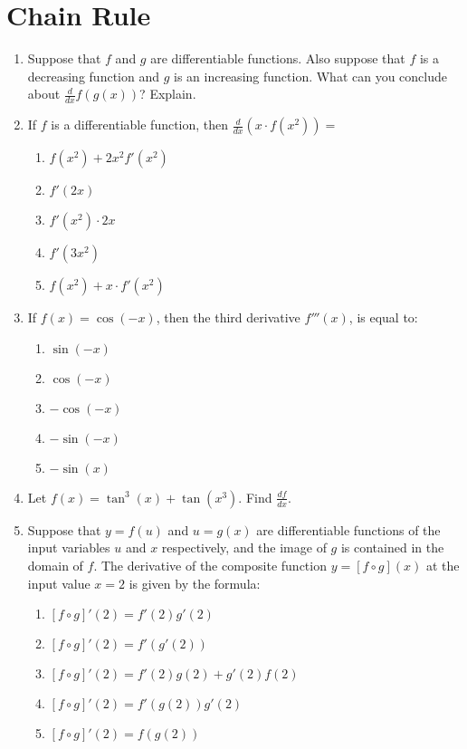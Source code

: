 \documentclass[12pt]{report}
\begin{document}
\newcommand{\less}{\textless}
\newcommand{\greater}{\textgreater}
\newcommand{\reals}{\mathbb{R}}
\newcommand{\integers}{\mathbb{Z}}
\newcommand{\rationals}{\mathbb{Q}}
\newcommand{\dsp}{\displaystyle}

\section*{Chain Rule}

\begin{enumerate}

\item Suppose that $f$ and $g$ are differentiable functions. Also suppose that $f$ is a decreasing function and $g$ is an increasing function. What can you conclude about $\frac{d}{dx}f\left(g(x)\right)$? Explain. 

\item If $f$ is a differentiable function, then $\frac{d}{dx}(x\cdot f(x^2))=$
\begin{enumerate}
\item $f(x^2)+2x^2f'(x^2)$
\item $f'(2x)$
\item $f'(x^2)\cdot 2x$
\item $f'(3x^2)$
\item $f(x^2)+x\cdot f'(x^2)$
\end{enumerate}

\item If $f(x)=\cos(-x)$, then the third derivative $f'''(x)$, is equal to:
\begin{enumerate}
\item $\sin(-x)$
\item $\cos(-x)$
\item $-\cos(-x)$
\item $-\sin(-x)$
\item $-\sin(x)$
\end{enumerate}

	\item Let $f(x) = \tan^3(x)+\tan\left(x^3\right)$. Find $\dsp \frac{df}{dx}$.

\item Suppose that $y=f(u)$ and $u=g(x)$ are differentiable functions of the input variables $u$  and $x$ respectively, and the image of $g$ is contained in the domain of $f$. The derivative of the composite function $y=[f\circ g](x)$ at the input value $x=2$ is given by the formula:
\begin{enumerate}
\item $[f\circ g]'(2)=f'(2)g'(2)$
\item $[f\circ g]'(2)=f'(g'(2))$
\item $[f\circ g]'(2)=f'(2)g(2)+g'(2)f(2)$
\item $[f\circ g]'(2)=f'(g(2))g'(2)$
\item $[f\circ g]'(2)=f(g(2))$
\end{enumerate}



\end{enumerate}
\end{document}
